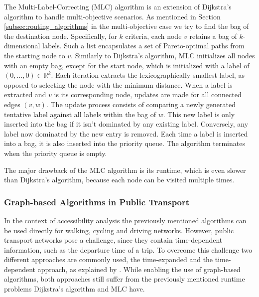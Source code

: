 The Multi-Label-Correcting (MLC)  algorithm is an extension of Dijkstra's algorithm to handle multi-objective scenarios.
As mentioned in Section \ref{subsec:routing_algorithms} in the multi-objective case we try to find the bag of the destination node.
Specifically, for \(k\) criteria, each node \(v\) retains a bag of \(k\)-dimensional labels. Such a list encapsulates a set of Pareto-optimal paths from the starting node to \(v\).
Similarly to Dijkstra's algorithm, MLC initializes all nodes with an empty bag, except for the start node, which is initialized with a label of \( (0, \dots, 0) \in \mathbb{R}^k \).
Each iteration extracts the lexicographically smallest label, as opposed to selecting the node with the minimum distance.
When a label is extracted and \(v\) is its corresponding node, updates are made for all connected edges \( (v, w) \).
The update process consists of comparing a newly generated tentative label against all labels within the bag of \(w\).
This new label is only inserted into the bag if it isn't dominated by any existing label.
Conversely, any label now dominated by the new entry is removed.
Each time a label is inserted into a bag, it is also inserted into the priority queue.
The algorithm terminates when the priority queue is empty.

The major drawback of the MLC algorithm is its runtime, which is even slower than Dijkstra's algorithm, because each node can be visited multiple times.


\subsubsection{Graph-based Algorithms in Public Transport}
\label{subsubsec:graph_based_algorithms_in_public_transport}


In the context of accessibility analysis the previously mentioned algorithms can be used directly for walking, cycling and driving networks.
However, public transport networks pose a challenge, since they contain time-dependent information, such as the departure time of a trip.
To overcome this challenge two different approaches are commonly used, the time-expanded and the time-dependent approach, as explained by \cite{muller-hannemannTimetableInformationModels2007}.
While enabling the use of graph-based algorithms, both approaches still suffer from the previously mentioned runtime problems Dijkstra's algorithm and MLC have.

